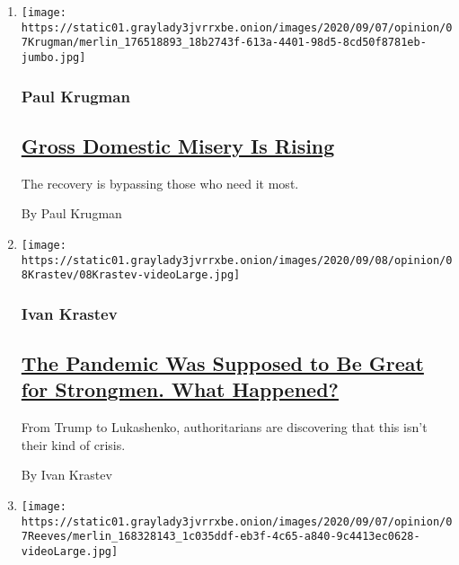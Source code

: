 \begin{enumerate}
\def\labelenumi{\arabic{enumi}.}
\item
  \texttt{[image: https://static01.graylady3jvrrxbe.onion/images/2020/09/07/opinion/07Krugman/merlin\_176518893\_18b2743f-613a-4401-98d5-8cd50f8781eb-jumbo.jpg]}

  \hypertarget{paul-krugman}{%
  \subsubsection{Paul Krugman}\label{paul-krugman}}

  \hypertarget{gross-domestic-misery-is-rising}{%
  \subsection{\texorpdfstring{\href{/2020/09/07/opinion/trump-economy-jobs.html}{Gross
  Domestic Misery Is
  Rising}}{Gross Domestic Misery Is Rising}}\label{gross-domestic-misery-is-rising}}

  The recovery is bypassing those who need it most.

  By Paul Krugman
\item
  \texttt{[image: https://static01.graylady3jvrrxbe.onion/images/2020/09/08/opinion/08Krastev/08Krastev-videoLarge.jpg]}

  \hypertarget{ivan-krastev}{%
  \subsubsection{Ivan Krastev}\label{ivan-krastev}}

  \hypertarget{the-pandemic-was-supposed-to-be-great-for-strongmen-what-happened}{%
  \subsection{\texorpdfstring{\href{/2020/09/08/opinion/coronavirus-dictatorships.html}{The
  Pandemic Was Supposed to Be Great for Strongmen. What
  Happened?}}{The Pandemic Was Supposed to Be Great for Strongmen. What Happened?}}\label{the-pandemic-was-supposed-to-be-great-for-strongmen-what-happened}}

  From Trump to Lukashenko, authoritarians are discovering that this
  isn't their kind of crisis.

  By Ivan Krastev
\item
  \texttt{[image: https://static01.graylady3jvrrxbe.onion/images/2020/09/07/opinion/07Reeves/merlin\_168328143\_1c035ddf-eb3f-4c65-a840-9c4413ec0628-videoLarge.jpg]}


\end{enumerate}
